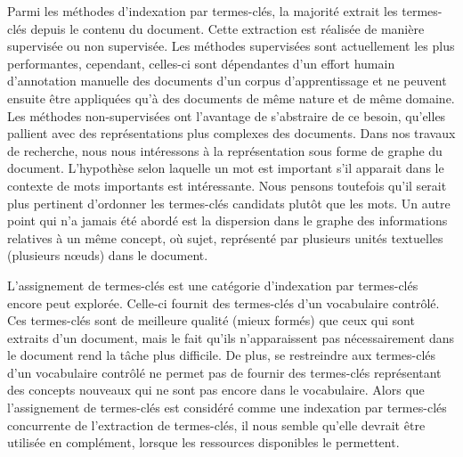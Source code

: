     Parmi les méthodes d'indexation par termes-clés, la majorité extrait les
    termes-clés depuis le contenu du document. Cette extraction est réalisée de
    manière supervisée ou non supervisée. Les méthodes supervisées sont
    actuellement les plus performantes, cependant, celles-ci sont dépendantes
    d'un effort humain d'annotation manuelle des documents d'un corpus
    d'apprentissage et ne peuvent ensuite être appliquées qu'à des documents de
    même nature et de même domaine. Les méthodes non-supervisées ont l'avantage
    de s'abstraire de ce besoin, qu'elles pallient avec des représentations plus
    complexes des documents. Dans nos travaux de recherche, nous nous intéressons
    à la représentation sous forme de graphe du document. L'hypothèse selon
    laquelle un mot est important s'il apparait dans le contexte de mots
    importants est intéressante. Nous pensons toutefois qu'il serait plus
    pertinent d'ordonner les termes-clés candidats plutôt que les mots. Un autre
    point qui n'a jamais été abordé est la dispersion dans le graphe des
    informations relatives à un même concept, où sujet, représenté par plusieurs
    unités textuelles (plusieurs n\oe{}uds) dans le document.

    L'assignement de termes-clés est une catégorie d'indexation par termes-clés
    encore peut explorée. Celle-ci fournit des termes-clés d'un vocabulaire
    contrôlé. Ces termes-clés sont de meilleure qualité (mieux formés) que ceux
    qui sont extraits d'un document, mais le fait qu'ils n'apparaissent pas
    nécessairement dans le document rend la tâche plus difficile. De plus, se
    restreindre aux termes-clés d'un vocabulaire contrôlé ne permet pas de
    fournir des termes-clés représentant des concepts nouveaux qui ne sont pas
    encore dans le vocabulaire. Alors que l'assignement de termes-clés est
    considéré comme une indexation par termes-clés concurrente de l'extraction
    de termes-clés, il nous semble qu'elle devrait être utilisée en complément,
    lorsque les ressources disponibles le permettent.

